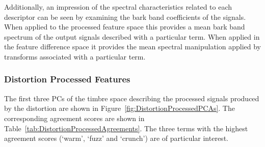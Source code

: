 		Additionally, an impression of the spectral characteristics related to each descriptor can be seen by
		examining the bark band coefficients of the signals. When applied to the processed feature space this
		provides a mean bark band spectrum of the output signals described with a particular term. When applied in
		the feature difference space it provides the mean spectral manipulation applied by transforms associated
		with a particular term.

		\subsubsection*{Distortion Processed Features}
			The first three PCs of the timbre space describing the processed signals produced by the distortion
			are shown in Figure~\ref{fig:DistortionProcessedPCAs}. The corresponding agreement scores are shown
			in Table~\ref{tab:DistortionProcessedAgreements}. The three terms with the highest agreement scores
			(`warm', `fuzz' and `crunch') are of particular interest.

